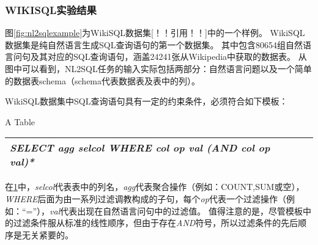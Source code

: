 \subsubsection{WIKISQL实验结果}

图\ref{fig:nl2sqlexample}为WikiSQL数据集[！！引用！！]中的一个样例。
WikiSQL数据集是纯自然语言生成SQL查询语句的第一个数据集。
其中包含80654组自然语言问句及其对应的SQL查询语句，涵盖24241张从Wikipedia中获取的数据表。
从图中可以看到，NL2SQL任务的输入实际包括两部分：自然语言问题以及一个简单的数据表schema（schema代表数据表及表中的列）。

WikiSQL数据集中SQL查询语句具有一定的约束条件，必须符合如下模板：

\begin{table}[!hpb]
    \centering
      {A Table}
    \label{nli:sqlmb}
    \begin{tabular}{@{}llr@{}} \toprule
    \emph{SELECT   agg   selcol   WHERE   col   op   val   (AND   col   op   val)*}\\\bottomrule
  
    \end{tabular}
  \end{table}

  在\ref{nli:sqlmb}中，\emph{selcol}代表表中的列名，\emph{agg}代表聚合操作（例如：COUNT,SUM或空），
  \emph{WHERE}后面为由一系列过滤调教构成的子句，每个\emph{op}代表一个过滤操作（例如：“=”），\emph{val}代表出现在自然语言问句中的过滤值。
  值得注意的是，尽管模板中的过滤条件服从标准的线性顺序，但由于存在\emph{AND}符号，所以过滤条件的先后顺序是无关紧要的。

